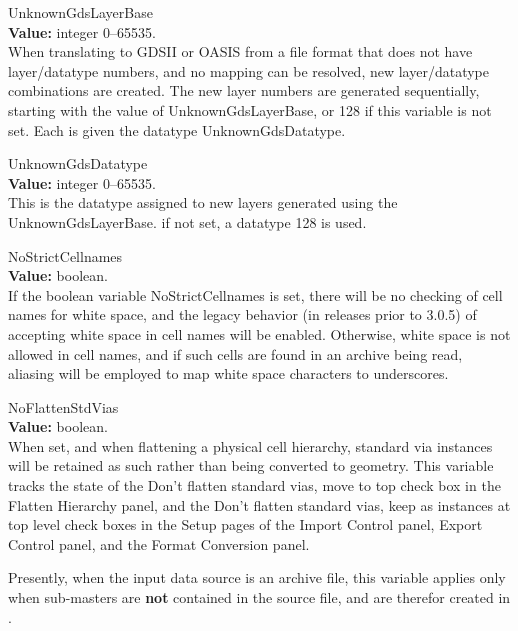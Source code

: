 \begin{description}
\item{\et UnknownGdsLayerBase}\\
{\bf Value:} integer 0--65535.\\
When translating to GDSII or OASIS from a file format that does not
have layer/datatype numbers, and no mapping can be resolved, new
layer/datatype combinations are created.  The new layer numbers are
generated sequentially, starting with the value of {\et
UnknownGdsLayerBase}, or 128 if this variable is not set.  Each is
given the datatype {\et UnknownGdsDatatype}.

\item{\et UnknownGdsDatatype}\\
{\bf Value:} integer 0--65535.\\
This is the datatype assigned to new layers generated using the
{\et UnknownGdsLayerBase}.  if not set, a datatype 128 is used.

\item{\et NoStrictCellnames}\\
{\bf Value:} boolean.\\
If the boolean variable {\et NoStrictCellnames} is set, there will be
no checking of cell names for white space, and the legacy behavior (in
releases prior to 3.0.5) of accepting white space in cell names will
be enabled.  Otherwise, white space is not allowed in cell names, and
if such cells are found in an archive being read, aliasing will be
employed to map white space characters to underscores.

\item{\et NoFlattenStdVias}\\
{\bf Value:} boolean.\\
When set, and when flattening a physical cell hierarchy, standard via
instances will be retained as such rather than being converted to
geometry.  This variable tracks the state of the {\cb Don't flatten
standard vias, move to top} check box in the {\cb Flatten Hierarchy}
panel, and the {\cb Don't flatten standard vias, keep as instances at
top level} check boxes in the {\cb Setup} pages of the {\cb Import
Control} panel, {\cb Export Control} panel, and the {\cb Format
Conversion} panel.

Presently, when the input data source is an archive file, this
variable applies only when sub-masters are {\bf not} contained in the
source file, and are therefor created in {\Xic}.


\end{description}
